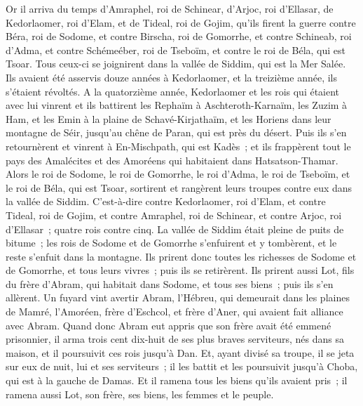 \begin{multicols}{2}
\VerseOne{}Or il arriva du temps d'Amraphel, roi de Schinear, d'Arjoc, roi d'Ellasar, de Kedorlaomer, roi d'Elam, et de Tideal, roi de Gojim,
qu'ils firent la guerre contre Béra, roi de Sodome, et contre Birscha, roi de Gomorrhe, et contre Schineab, roi d'Adma, et contre Schémeéber, roi de Tseboïm, et contre le roi de Béla, qui est Tsoar.
Tous ceux-ci se joignirent dans la vallée de Siddim, qui est la Mer Salée.
Ils avaient été asservis douze années à Kedorlaomer, et la treizième année, ils s'étaient révoltés.
A la quatorzième année, Kedorlaomer et les rois qui étaient avec lui vinrent et ils battirent les Rephaïm à Aschteroth-Karnaïm, les Zuzim à Ham, et les Emin à la plaine de Schavé-Kirjathaïm,
et les Horiens dans leur montagne de Séir, jusqu'au chêne de Paran, qui est près du désert.
Puis ils s'en retournèrent et vinrent à En-Mischpath, qui est Kadès~; et ils frappèrent tout le pays des Amalécites et des Amoréens qui habitaient dans Hatsatson-Thamar.
Alors le roi de Sodome, le roi de Gomorrhe, le roi d'Adma, le roi de Tseboïm, et le roi de Béla, qui est Tsoar, sortirent et rangèrent leurs troupes contre eux dans la vallée de Siddim.
C'est-à-dire contre Kedorlaomer, roi d'Elam, et contre Tideal, roi de Gojim, et contre Amraphel, roi de Schinear, et contre Arjoc, roi d'Ellasar~; quatre rois contre cinq.
La vallée de Siddim était pleine de puits de bitume~; les rois de Sodome et de Gomorrhe s'enfuirent et y tombèrent, et le reste s'enfuit dans la montagne.
Ils prirent donc toutes les richesses de Sodome et de Gomorrhe, et tous leurs vivres~; puis ils se retirèrent.
Ils prirent aussi Lot, fils du frère d'Abram, qui habitait dans Sodome, et tous ses biens~; puis ils s'en allèrent.
Un fuyard vint avertir Abram, l'Hébreu, qui demeurait dans les plaines de Mamré, l'Amoréen, frère d'Eschcol, et frère d'Aner, qui avaient fait alliance avec Abram.
Quand donc Abram eut appris que son frère avait été emmené prisonnier, il arma trois cent dix-huit de ses plus braves serviteurs, nés dans sa maison, et il poursuivit ces rois jusqu'à Dan.
Et, ayant divisé sa troupe, il se jeta sur eux de nuit, lui et ses serviteurs~; il les battit et les poursuivit jusqu'à Choba, qui est à la gauche de Damas.
Et il ramena tous les biens qu'ils avaient pris~; il ramena aussi Lot, son frère, ses biens, les femmes et le peuple.

\end{multicols}
